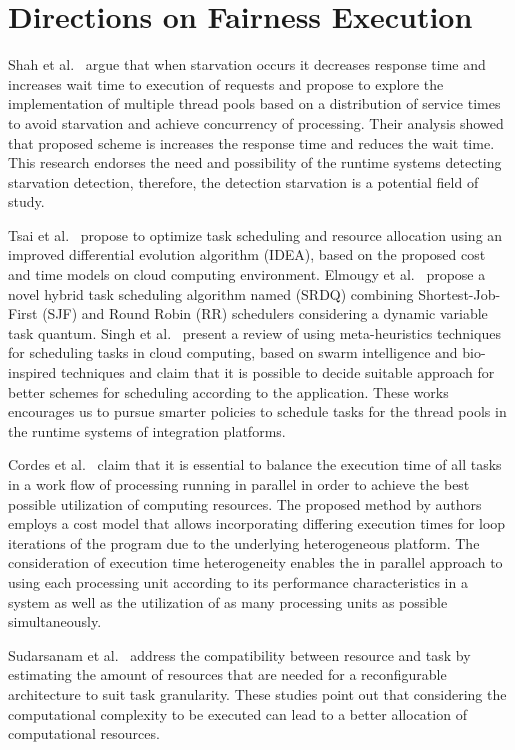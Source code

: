\section{{Directions on Fairness Execution}}
\label{sec:directions_fairness}
Shah et al.~\cite{shah2017} argue that when starvation occurs it decreases response time and increases wait time to execution of requests and propose to explore the implementation of multiple thread pools based on a distribution of service times to avoid starvation and achieve concurrency of processing. Their analysis showed that proposed scheme is increases the response time and reduces the wait time. This research endorses the need and possibility of the runtime systems detecting starvation detection, therefore, the detection starvation is a potential field of study.

Tsai et al.~\cite{tsai2013} propose to optimize task scheduling and resource allocation using an improved differential evolution algorithm (IDEA), based on the proposed cost and time models on cloud computing environment. Elmougy et al.~\cite{elmougy2017} propose a novel hybrid task scheduling algorithm named (SRDQ) combining Shortest-Job-First (SJF) and Round Robin (RR) schedulers considering a dynamic variable task quantum. Singh et al.~\cite{singh2017} present a review of using meta-heuristics techniques for scheduling tasks in cloud computing, based on swarm intelligence and bio-inspired techniques and claim that it is possible to decide suitable approach for better schemes for scheduling according to the application. These works encourages us to pursue smarter policies to schedule tasks for the thread pools in the runtime systems of integration platforms.

Cordes et al.~\cite{cordes2011} claim that it is essential to balance the execution time of all tasks in a work flow of processing running in parallel in order to achieve the best possible utilization of computing resources. The proposed method by authors employs a cost model that allows incorporating differing execution times for loop iterations of the program due to the underlying heterogeneous platform. The consideration of execution time heterogeneity enables the in parallel approach to using each processing unit according to its performance characteristics in a system as well as the utilization of as many processing units as possible simultaneously.

Sudarsanam et al.~\cite{sudarsanam2004} address the compatibility between resource and task by estimating the amount of resources that are needed for a reconfigurable architecture to suit task granularity. These studies point out that considering the computational complexity to be executed can lead to a better allocation of computational resources.